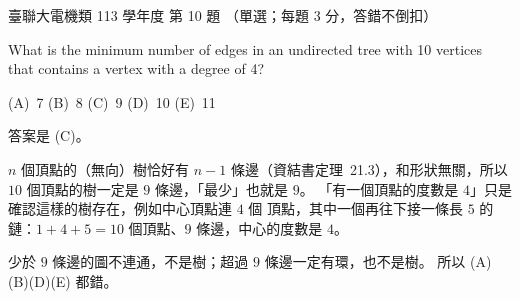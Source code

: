 \begin{pastexam}[label={px:ust-113-ee-ds-10}]{臺聯大電機類 113 學年度 第 10 題}
（單選；每題 3 分，答錯不倒扣）

What is the minimum number of edges in an undirected tree with 10 vertices that contains a vertex
with a degree of 4?

(A)~7 \qquad (B)~8 \qquad (C)~9 \qquad (D)~10 \qquad (E)~11
\end{pastexam}

\begin{pastsoln}
答案是 (C)。

$n$ 個頂點的（無向）樹恰好有 $n - 1$ 條邊（資結書定理~21.3），和形狀無關，所以 $10$ 個頂點的樹一定是
$9$ 條邊，「最少」也就是 $9$。 「有一個頂點的度數是 $4$」只是確認這樣的樹存在，例如中心頂點連 $4$ 個
頂點，其中一個再往下接一條長 $5$ 的鏈：$1 + 4 + 5 = 10$ 個頂點、$9$ 條邊，中心的度數是 $4$。

少於 $9$ 條邊的圖不連通，不是樹；超過 $9$ 條邊一定有環，也不是樹。 所以 (A)(B)(D)(E) 都錯。
\end{pastsoln}
